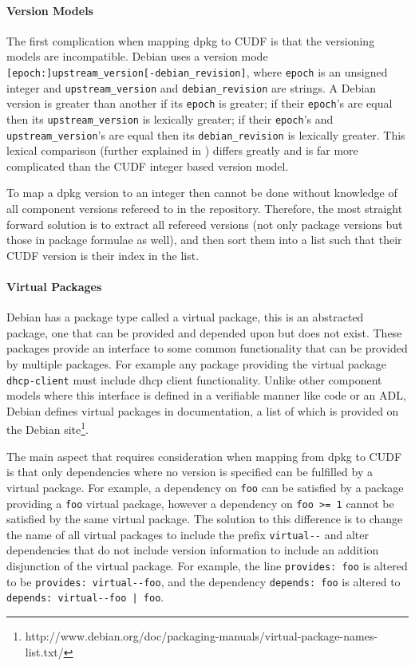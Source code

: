 \paragraph{Version Models}
The first complication when mapping dpkg to CUDF is that the versioning models are incompatible.
Debian uses a version mode \verb+[epoch:]upstream_version[-debian_revision]+,
where \verb+epoch+ is an unsigned integer and \verb+upstream_version+ and \verb+debian_revision+ are strings.
A Debian version is greater than another if its \verb+epoch+ is greater; 
if their \verb+epoch+'s are equal then its \verb+upstream_version+ is lexically greater; 
if their \verb+epoch+'s and \verb+upstream_version+'s are equal then its \verb+debian_revision+ is lexically greater.
This lexical comparison (further explained in \cite{Barth2005}) differs greatly and is far more complicated than the CUDF integer based version model.

To map a dpkg version to an integer then cannot be done without knowledge of all component versions refereed to in the repository.
Therefore, the most straight forward solution is to extract all refereed versions (not only package versions but those in package formulae as well),
and then sort them into a list such that their CUDF version is their index in the list.

\paragraph{Virtual Packages}
Debian has a package type called a virtual package, this is an abstracted package, one that can be provided and depended upon but does not exist.
These packages provide an interface to some common functionality that can be provided by multiple packages.
For example any package providing the virtual package \verb+dhcp-client+ must include dhcp client functionality. 
Unlike other component models where this interface is defined in a verifiable manner like code or an ADL,
Debian defines virtual packages in documentation, a list of which is provided on the Debian site\footnote{http://www.debian.org/doc/packaging-manuals/virtual-package-names-list.txt/}.

The main aspect that requires consideration when mapping from dpkg to CUDF is that only dependencies where no version is specified can be fulfilled by a virtual package.
For example, a dependency on \verb+foo+ can be satisfied by a package providing a \verb+foo+ virtual package, 
however a dependency on \verb+foo >= 1+ cannot be satisfied by the same virtual package. 
The solution to this difference is to change the name of all virtual packages to include the prefix \verb+virtual--+ and 
alter dependencies that do not include version information to include an addition disjunction of the virtual package.
For example, the line \verb+provides: foo+ is altered to be \verb+provides: virtual--foo+, 
and the dependency \verb+depends: foo+ is altered to \verb+depends: virtual--foo | foo+.

